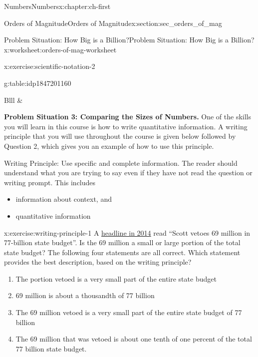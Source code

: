 \documentclass[twoside,10pt,]{book}
\makeatletter
\numberwithin{equation}{chapter}
\newcommand{\hrulemedium}{\noalign{\hrule height 0.07em}}
\newcommand{\tablecelllines}[3]%
{\begin{tabular}[#2]{@{}#1@{}}#3\end{tabular}}
\makeatother
\begin{document}
\begin{chapterptx}{Numbers}{}{Numbers}{}{}{x:chapter:ch-first}
\begin{sectionptx}{Orders of Magnitude}{}{Orders of Magnitude}{}{}{x:section:sec_orders_of_mag}
\begin{worksheet-subsection-numberless}{Problem Situation: How Big is a Billion?}{}{Problem Situation: How Big is a Billion?}{}{}{x:worksheet:orders-of-mag-worksheet}
\begin{exercisegroup}
\begin{divisionexerciseeg}{9}{}{}{x:exercise:scientific-notation-2}
\begin{tableptx}{\textbf{}}{g:table:idp1847201160}{}
{\begin{tabular}{Blll}
{{}
}&\multicolumn{1}{lB}{\tablecelllines{l}{m}
{\\
\\
}
}\tabularnewline\hrulemedium
\end{tabular}
}%
\end{tableptx}%
\end{divisionexerciseeg}%
\end{exercisegroup}
\par\medskip\noindent
\clearpage
\par\medskip\noindent%
\textbf{Problem Situation 3: Comparing the Sizes of Numbers.}\space\space%
One of the skills you will learn in this course is how to write quantitative information. A writing principle that you will use throughout the course is given below followed by Question 2, which gives you an example of how to use this principle.%
\par
Writing Principle: Use specific and complete information. The reader should understand what you are trying to say even if they have not read the question or writing prompt. This includes%
%
\begin{itemize}[label=\textbullet]
\item{}information about context, and%
\item{}quantitative information%
\end{itemize}
\begin{exercisegroup}
\begin{divisionexerciseeg}{10}{}{}{x:exercise:writing-principle-1}%
A \href{http://www.tallahassee.com/story/news/2014/06/03/scott-vetoes-million-billion-state-budget/9901117/}{headline in 2014}\footnotemark{} read “Scott vetoes \textdollar{}69 million in \textdollar{}77-billion state budget”.  Is the \textdollar{}69 million a small or large portion of the total state budget?  The following four statements are all correct. Which statement provides the best description, based on the writing principle? %
\begin{enumerate}[label=(\alph*)]
\item{}The portion vetoed is a very small part of the entire state budget%
\item{}\textdollar{}69 million is about a thousandth of \textdollar{}77 billion%
\item{}The \textdollar{}69 million vetoed is a very small part of the entire state budget of \textdollar{}77 billion%
\item{}The \textdollar{}69 million that was vetoed is about one tenth of one percent of the total \textdollar{}77 billion state budget.%

\end{enumerate}
\end{divisionexerciseeg}
\end{exercisegroup}
\end{worksheet-subsection-numberless}
\end{sectionptx}
\end{chapterptx}
\end{document}
